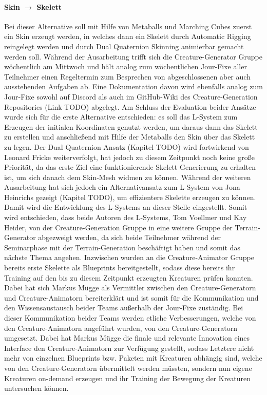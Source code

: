 \paragraph{Skin $\rightarrow$ Skelett} Bei dieser Alternative soll mit Hilfe von Metaballs und Marching Cubes zuerst ein Skin erzeugt werden, in welches dann ein Skelett durch Automatic Rigging reingelegt werden und durch Dual Quaternion Skinning animierbar gemacht werden soll. Während der Ausarbeitung trifft sich die Creature-Generator Gruppe wöchentlich am Mittwoch und hält analog zum wöchentlichen Jour-Fixe aller Teilnehmer einen Regeltermin zum Besprechen von abgeschlossenen aber auch ausstehenden Aufgaben ab. Eine Dokumentation davon wird ebenfalls analog zum Jour-Fixe sowohl auf Discord als auch im GitHub-Wiki des Creature-Generation Repositories (Link TODO) abgelegt. Am Schluss der Evaluation beider Ansätze wurde sich für die erste Alternative entschieden: es soll das L-System zum Erzeugen der initialen Koordinaten genutzt werden, um daraus dann das Skelett zu erstellen und anschließend mit Hilfe der Metaballs den Skin über das Skelett zu legen. Der Dual Quaternion Ansatz (Kapitel TODO) wird fortwirkend von Leonard Fricke weiterverfolgt, hat jedoch zu diesem Zeitpunkt noch keine große Priorität, da das erste Ziel eine funktionierende Skelett Generierung zu erhalten ist, um sich danach dem Skin-Mesh widmen zu können. Während der weiteren Ausarbeitung hat sich jedoch ein Alternativansatz zum L-System von Jona Heinrichs gezeigt (Kapitel TODO), um effizientere Skelette erzeugen zu können. Damit wird die Entwicklung des L-Systems an dieser Stelle eingestellt. Somit wird entschieden, dass beide Autoren des L-Systems, Tom Voellmer und Kay Heider, von der Creature-Generation Gruppe in eine weitere Gruppe der Terrain-Generator abgezweigt werden, da sich beide Teilnehmer während der Seminarphase mit der Terrain-Generation beschäftigt haben und somit das nächste Thema angehen. Inzwischen wurden an die Creature-Animator Gruppe bereits erste Skelette als Blueprints bereitgestellt, sodass diese bereits ihr Training auf den bis zu diesem Zeitpunkt erzeugten Kreaturen prüfen konnten. Dabei hat sich Markus Mügge als Vermittler zwischen den Creature-Generatorn und Creature-Animatorn bereiterklärt und ist somit für die Kommunikation und den Wissensaustausch beider Teams außerhalb der Jour-Fixe zuständig. Bei dieser Kommunikation beider Teams werden etliche Verbesserungen, welche von den Creature-Animatorn angeführt wurden, von den Creature-Generatorn umgesetzt. Dabei hat Markus Mügge die finale und relevante Innovation eines Interface den Creature-Animatorn zur Verfügung gestellt, sodass Letztere nicht mehr von einzelnen Blueprints bzw. Paketen mit Kreaturen abhängig sind, welche von den Creature-Generatorn übermittelt werden müssten, sondern nun eigene Kreaturen on-demand erzeugen und ihr Training der Bewegung der Kreaturen untersuchen können.



